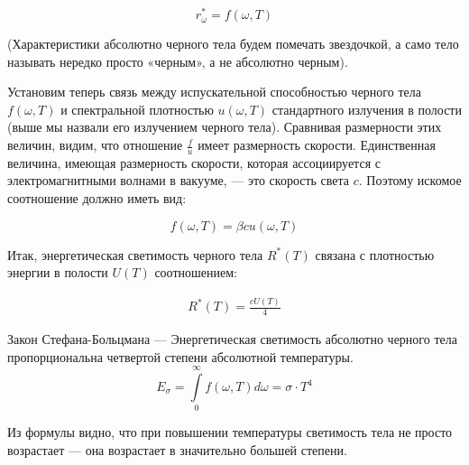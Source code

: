 \documentclass[__main__.tex]{subfiles}
\begin{document}
$$r_ω^{*} = f(ω,T)$$

(Характеристики абсолютно черного тела будем помечать звездочкой, а само тело называть нередко просто «черным», а не абсолютно черным).

Установим теперь связь между испускательной способностью черного тела $f(ω,T)$ и спектральной плотностью  $u(ω,T)$ стандартного излучения в полости (выше мы назвали его излучением черного тела). Сравнивая размерности этих величин, видим, что отношение $\frac{f}{u}$ имеет размерность скорости. Единственная величина, имеющая размерность скорости, которая ассоциируется с электромагнитными волнами в вакууме, — это скорость света $c$. Поэтому искомое соотношение должно иметь вид:

$$f(ω,T)=βcu(ω,T)$$

Итак, энергетическая светимость черного тела  $R^{*}(T)$  связана с плотностью энергии в полости $U(T)$ соотношением:

\begin{gather}
R^{*} (T)=\frac{cU(T)}{4}  
\end{gather}


Закон Стефана-Больцмана — Энергетическая светимость абсолютно черного тела пропорциональна четвертой степени абсолютной температуры.\\

$$E_σ = \int\limits_{0}^{\infty} f(ω,T)dω = σ\cdot T^4$$

Из формулы видно, что при повышении температуры светимость тела не просто возрастает — она возрастает в значительно большей степени.
\end{document}
